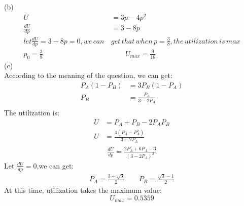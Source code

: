 \documentclass[UTF8,oneside]{article}
\begin{document}
(b)\\
\begin{align*}
U&=3p-4p^2\\
\frac{dU}{dp}&=3-8p\\
let \frac{dU}{dp}=3-8p=0,we\,can\,&get\,that\,when\,p=\frac{3}{8},the\,utilization\,is\,max\\
p_0=\frac{3}{8}\qquad&\qquad U_{max}=\frac{9}{16}
\end{align*}
(c)\\
According to the meaning of the question, we can get:
\begin{align*}
P_A(1-P_B)&=3P_B(1-P_A)\\
P_B&=\frac{P_A}{3-2P_A}\\
\end{align*}
The utilization is:
\begin{align*}
U&=P_A+P_B-2P_AP_B\\
U&=\frac{4(P_A-P_A^2)}{3-2P_A}
\end{align*}
\begin{align*}
\frac{dU}{dp}=\frac{2P_A^2+6P_A-3}{(3-2P_A)^2}
\end{align*}
Let $\frac{dU}{dp}=0$,we can get:
\begin{align*}
P_A=\frac{3-\sqrt{3}}{2}\qquad P_B=\frac{\sqrt{3}-1}{2}
\end{align*}
At this time, utilization takes the maximum value:$$U_{max}=0.5359$$
\end{document}
